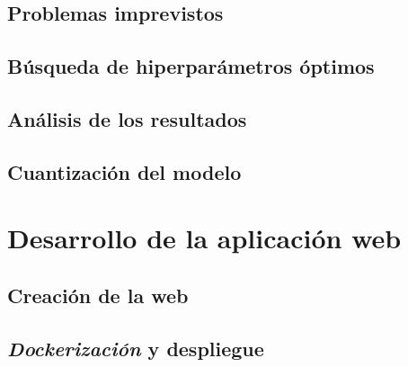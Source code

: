 \subsection{Problemas imprevistos}

\subsection{Búsqueda de hiperparámetros óptimos}

\subsection{Análisis de los resultados}

\subsection{Cuantización del modelo}



\section{Desarrollo de la aplicación web}

\subsection{Creación de la web}

\subsection{\textit{Dockerización} y despliegue}
 